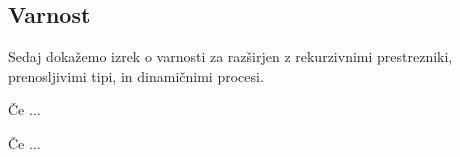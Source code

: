 \subsection{Varnost}

Sedaj dokažemo izrek o varnosti za \lae{} razširjen z rekurzivnimi prestrezniki, prenosljivimi tipi, in dinamičnimi procesi.

\begin{izrek}
	Če ...
\end{izrek}



\begin{izrek}
	Če ...
\end{izrek}



